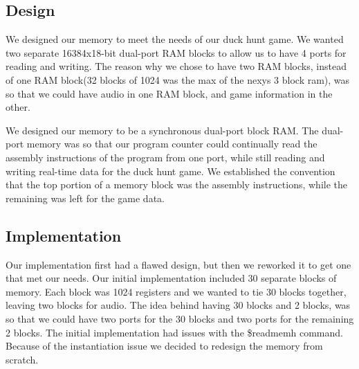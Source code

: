 \documentclass[11pt]{article}
\begin{document}
\subsection{Design}
We designed our memory to meet the needs of our duck hunt game. We wanted two separate 16384x18-bit dual-port RAM blocks to allow us to have 4 ports for reading and writing. The reason why we chose to have two RAM blocks, instead of one RAM block(32 blocks of 1024 was the max of the nexys 3 block ram), was so that we could have audio in one RAM block, and game information in the other.
 
We designed our memory to be a synchronous dual-port block RAM. The dual-port memory was so that our program counter could continually read the assembly instructions of the program from one port, while still reading and writing real-time data for the duck hunt game. We established the convention that the top portion of a memory block was the assembly instructions, while the remaining was left for the game data.

\subsection{Implementation}
Our implementation first had a flawed design, but then we reworked it to get one that met our needs. Our initial implementation included 30 separate blocks of memory. Each block was 1024 registers and we wanted to tie 30 blocks together, leaving two blocks for audio.  The idea behind having 30 blocks and 2 blocks, was so that we could have two ports for the 30 blocks and two ports for the remaining 2 blocks. The initial implementation had issues with the \$readmemh command. Because of the instantiation issue we decided to redesign the memory from scratch.
 
\end{document}
